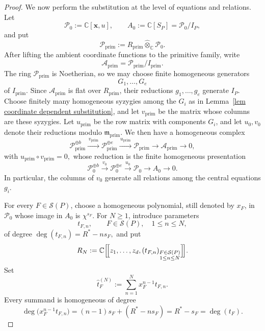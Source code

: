 \documentclass[11pt]{amsart}
\numberwithin{equation}{section}
\theoremstyle{plain}
\theoremstyle{definition}
\newcommand{\0}{$0$-mutable}
\newcommand{\CC}{\ensuremath{\mathbb{C}}}
\newcommand{\bfx}{\ensuremath{\mathbf{x}}}
\renewcommand{\1}{$1$-rigid}
\renewcommand{\0}{$0$-mutable}
\begin{document}
\begin{proof}
We now perform the substitution at the level of equations and
relations. Let
\[
\mathcal P_0:=\CC[\bfx,u],
\qquad
A_0:=\CC[S_P]=\mathcal P_0/I_P,
\]
and put
\[
\mathcal P_{\mathrm{prim}}
:=
R_{\mathrm{prim}}
\widehat\otimes_{\CC}\mathcal P_0.
\]
After lifting the ambient coordinate functions to the primitive family,
write
\[
\mathcal A_{\mathrm{prim}}
=
\mathcal P_{\mathrm{prim}}/I_{\mathrm{prim}}.
\]
The ring \(\mathcal P_{\mathrm{prim}}\) is Noetherian, so we may choose
finite homogeneous generators
\[
G_1,\ldots,G_e
\]
of \(I_{\mathrm{prim}}\). Since
\(\mathcal A_{\mathrm{prim}}\) is flat over \(R_{\mathrm{prim}}\), their
reductions \(g_1,\ldots,g_e\) generate \(I_P\). Choose finitely many
homogeneous syzygies among the \(G_i\) as in
Lemma~\ref{lem coordinate dependent substitution}, and let
\(v_{\mathrm{prim}}\) be the matrix whose columns are these syzygies.
Let \(u_{\mathrm{prim}}\) be the row matrix with components \(G_i\), and
let \(u_0,v_0\) denote their reductions modulo
\(\mathfrak m_{\mathrm{prim}}\). We then have a homogeneous complex
\begin{equation}
\label{eq primitive finite presentation}
\mathcal P_{\mathrm{prim}}^{\oplus b}
\xrightarrow{\,v_{\mathrm{prim}}\,}
\mathcal P_{\mathrm{prim}}^{\oplus e}
\xrightarrow{\,u_{\mathrm{prim}}\,}
\mathcal P_{\mathrm{prim}}
\longrightarrow
\mathcal A_{\mathrm{prim}}
\longrightarrow0,
\end{equation}
with
$
u_{\mathrm{prim}}\circ v_{\mathrm{prim}}=0,
$
whose reduction is the finite homogeneous presentation
\begin{equation}
\label{eq central finite presentation}
\mathcal P_0^{\oplus b}
\xrightarrow{\,v_0\,}
\mathcal P_0^{\oplus e}
\xrightarrow{\,u_0\,}
\mathcal P_0
\longrightarrow
A_0
\longrightarrow0.
\end{equation}
In particular, the columns of \(v_0\) generate all relations among the
central equations \(g_i\).

For every \(F\in\mathcal S(P)\), choose a homogeneous polynomial, still denoted by
\(x_F\), in \(\mathcal P_0\) whose image in \(A_0\) is
\(\chi^{s_F}\). For \(N\geq1\), introduce parameters
\[
t_{F,n},
\qquad
F\in\mathcal S(P),
\quad
1\leq n\leq N,
\]
of degree
$
\deg(t_{F,n})=R^*-ns_F,
$
and put
\[
R_N
:=
\CC\Bigl[\!\Bigl[
z_1,\ldots,z_d,
(t_{F,n})_{\substack{F\in\mathcal S(P)\\1\leq n\leq N}}
\Bigr]\!\Bigr].
\]
Set
\[
\widehat t_F^{(N)}
:=
\sum_{n=1}^N x_F^{n-1}t_{F,n}.
\]
Every summand is homogeneous of degree
\[
\deg\bigl(x_F^{n-1}t_{F,n}\bigr)
=
(n-1)s_F+(R^*-ns_F)
=
R^*-s_F
=
\deg(t_F).
\]


\end{proof}
\end{document}
